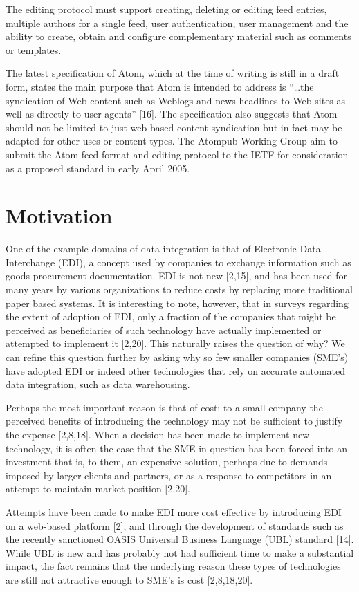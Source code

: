 \documentclass{CRPITStyle}
\begin{document}
The editing protocol must support creating, deleting or editing feed
entries, multiple authors for a single feed, user authentication, user
management and the ability to create, obtain and configure complementary
material such as comments or templates.

The latest specification of Atom, which at the time of writing is still
in a draft form, states the main purpose that Atom is intended to
address is ``\ldots{}the syndication of Web content such as Weblogs and news
headlines to Web sites as well as directly to user agents'' [16]. The
specification also suggests that Atom should not be limited to just web
based content syndication but in fact may be adapted for other uses or
content types. The Atompub Working Group aim to submit the Atom feed
format and editing protocol to the IETF for consideration as a proposed
standard in early April 2005.

\section{Motivation}

One of the example domains of data integration is that of Electronic
Data Interchange (EDI), a concept used by companies to exchange
information such as goods procurement documentation. EDI is not new
[2,15], and has been used for many years by various organizations to
reduce costs by replacing more traditional paper based systems. It is
interesting to note, however, that in surveys regarding the extent of
adoption of EDI, only a fraction of the companies that might be
perceived as beneficiaries of such technology have actually implemented
or attempted to implement it [2,20]. This naturally raises the question
of why? We can refine this question further by asking why so few smaller
companies (SME's) have adopted EDI or indeed other technologies that
rely on accurate automated data integration, such as data warehousing.

Perhaps the most important reason is that of cost: to a small company
the perceived benefits of introducing the technology may not be
sufficient to justify the expense [2,8,18]. When a decision has been
made to implement new technology, it is often the case that the SME in
question has been forced into an investment that is, to them, an
expensive solution, perhaps due to demands imposed by larger clients and
partners, or as a response to competitors in an attempt to maintain
market position [2,20].

Attempts have been made to make EDI more cost effective by introducing
EDI on a web-based platform [2], and through the development of
standards such as the recently sanctioned OASIS Universal Business
Language (UBL) standard [14]. While UBL is new and has probably not had
sufficient time to make a substantial impact, the fact remains that the
underlying reason these types of technologies are still not attractive
enough to SME's is cost [2,8,18,20].
\end{document}
